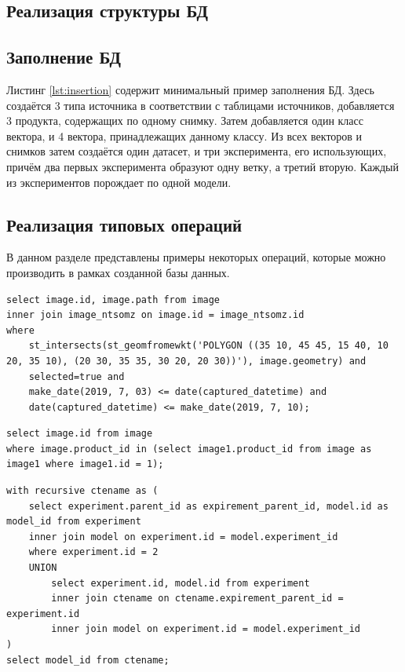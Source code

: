 \documentclass[a4paper]{article}
\begin{document}
\subsection{Реализация структуры БД}


\subsection{Заполнение БД}

Листинг \ref{lst:insertion} содержит минимальный пример заполнения БД.
Здесь создаётся 3 типа источника в соответствии с таблицами источников, добавляется 3 продукта, содержащих по одному снимку.
Затем добавляется один класс вектора, и 4 вектора, принадлежащих данному классу.
Из всех векторов и снимков затем создаётся один датасет, и три эксперимента, его использующих, причём два первых эксперимента образуют одну ветку, а третий вторую.
Каждый из экспериментов порождает по одной модели.

\subsection{Реализация типовых операций}
В данном разделе представлены примеры некоторых операций, которые можно производить в рамках созданной базы данных.

\begin{lstlisting}[captionpos=b, caption={Получение изображения, пересекающегося с заданным полигоном, являющегося отобранным для работы и снятого в конкретный промежуток времени.}]
select image.id, image.path from image
inner join image_ntsomz on image.id = image_ntsomz.id
where
	st_intersects(st_geomfromewkt('POLYGON ((35 10, 45 45, 15 40, 10 20, 35 10), (20 30, 35 35, 30 20, 20 30))'), image.geometry) and
	selected=true and
	make_date(2019, 7, 03) <= date(captured_datetime) and
	date(captured_datetime) <= make_date(2019, 7, 10);
\end{lstlisting}

\begin{lstlisting}[captionpos=b, caption={Получение стереопары по данному id изображения}]
select image.id from image
where image.product_id in (select image1.product_id from image as image1 where image1.id = 1);
\end{lstlisting}

\begin{lstlisting}[captionpos=b, caption={Получение всех моделей, порождённых данной веткой экспериментов}]
with recursive ctename as (
	select experiment.parent_id as expirement_parent_id, model.id as model_id from experiment
	inner join model on experiment.id = model.experiment_id
	where experiment.id = 2
	UNION
		select experiment.id, model.id from experiment
		inner join ctename on ctename.expirement_parent_id = experiment.id
		inner join model on experiment.id = model.experiment_id
)
select model_id from ctename;
\end{lstlisting}
\end{document}
